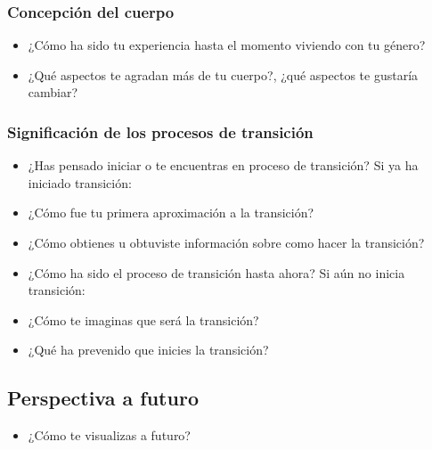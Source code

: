 \subsubsection{Concepción del cuerpo}

\begin{itemize}
\item
  ¿Cómo ha sido tu experiencia hasta el momento viviendo con tu género?
\item
  ¿Qué aspectos te agradan más de tu cuerpo?, ¿qué aspectos te gustaría
  cambiar?
\end{itemize}

\subsubsection{Significación de los procesos de transición}

\begin{itemize}
\item
  ¿Has pensado iniciar o te encuentras en proceso de transición? Si ya
  ha iniciado transición:
\item
  ¿Cómo fue tu primera aproximación a la transición?
\item
  ¿Cómo obtienes u obtuviste información sobre como hacer la transición?
\item
  ¿Cómo ha sido el proceso de transición hasta ahora? Si aún no inicia
  transición:
\item
  ¿Cómo te imaginas que será la transición?
\item
  ¿Qué ha prevenido que inicies la transición?
\end{itemize}

\subsection{Perspectiva a futuro}

\begin{itemize}
\item
  ¿Cómo te visualizas a futuro?
\end{itemize}
